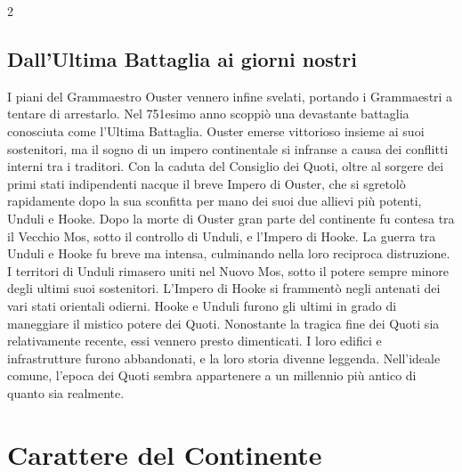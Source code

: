 \documentclass[10pt, a4paper]{report}
\begin{document}
\begin{multicols}{2}
\section*{Dall'Ultima Battaglia ai giorni nostri}
I piani del Grammaestro Ouster vennero infine svelati, portando i Grammaestri a tentare di arrestarlo. Nel 751esimo anno scoppiò una devastante battaglia conosciuta come l'Ultima Battaglia. Ouster emerse vittorioso insieme ai suoi sostenitori, ma il sogno di un impero continentale si infranse a causa dei conflitti interni tra i traditori.
Con la caduta del Consiglio dei Quoti, oltre al sorgere dei primi stati indipendenti nacque il breve Impero di Ouster, che si sgretolò rapidamente dopo la sua sconfitta per mano dei suoi due allievi più potenti, Unduli e Hooke. Dopo la morte di Ouster gran parte del continente fu contesa tra il Vecchio Mos, sotto il controllo di Unduli, e l'Impero di Hooke.
La guerra tra Unduli e Hooke fu breve ma intensa, culminando nella loro reciproca distruzione. I territori di Unduli rimasero uniti nel Nuovo Mos, sotto il potere sempre minore degli ultimi suoi sostenitori. L'Impero di Hooke si frammentò negli antenati dei vari stati orientali odierni.
Hooke e Unduli furono gli ultimi in grado di maneggiare il mistico potere dei Quoti.
Nonostante la tragica fine dei Quoti sia relativamente recente, essi vennero presto dimenticati. I loro edifici e infrastrutture furono abbandonati, e la loro storia divenne leggenda. Nell'ideale comune, l'epoca dei Quoti sembra appartenere a un millennio più antico di quanto sia realmente.


\end{multicols}

\chapter{Carattere del Continente}
\end{document}

